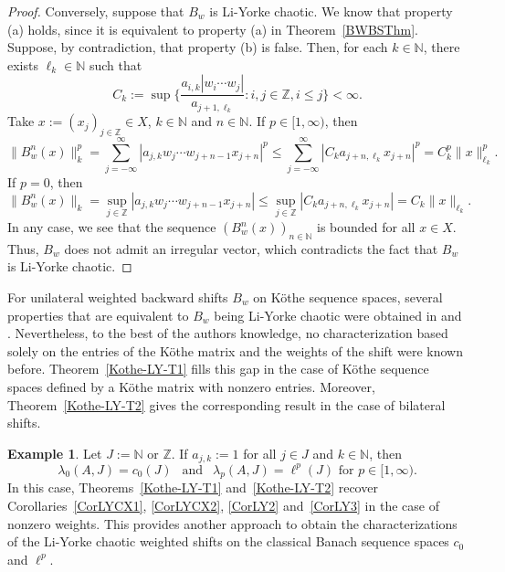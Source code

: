 \documentclass[12pt]{amsart}
\theoremstyle{theorem}
\theoremstyle{definition}
\newtheorem{example}[theorem]{Example}
\theoremstyle{remark} \theoremstyle{question} \theoremstyle{example}
\newcommand{\N}{\mathbb{N}}
\newcommand{\Z}{\mathbb{Z}}
\begin{document}
\begin{proof}
Conversely, suppose that $B_w$ is Li-Yorke chaotic.
We know that property (a) holds, since it is equivalent to property (a) in Theorem~\ref{BWBSThm}.
Suppose, by contradiction, that property (b) is false.
Then, for each $k \in \N$, there exists $\ell_k \in \N$ such that
\[
C_k\!:= \sup\Big\{\frac{a_{i,k} |w_i \cdots w_j|}{a_{j+1,\ell_k}} : i,j \in \Z, i \leq j\Big\} < \infty.
\]
Take $x\!:= (x_j)_{j \in \Z} \in X$, $k \in \N$ and $n \in \N$. If $p \in [1,\infty)$, then
\[
\|B_w^n(x)\|_k^p = \sum_{j=-\infty}^\infty |a_{j,k} w_j \cdots w_{j+n-1} x_{j+n}|^p
  \leq \sum_{j=-\infty}^\infty |C_k a_{j+n,\ell_k} x_{j+n}|^p = C_k^p \|x\|_{\ell_k}^p.
\]
If $p = 0$, then
\[
\|B_w^n(x)\|_k = \sup_{j \in \Z} |a_{j,k} w_j \cdots w_{j+n-1} x_{j+n}|
  \leq \sup_{j \in \Z} |C_k a_{j+n,\ell_k} x_{j+n}| = C_k \|x\|_{\ell_k}.
\]
In any case, we see that the sequence $(B_w^n(x))_{n \in \N}$ is bounded for all $x \in X$.
Thus, $B_w$ does not admit an irregular vector, which contradicts the fact that $B_w$ is Li-Yorke chaotic.
\end{proof}

For unilateral weighted backward shifts $B_w$ on K\"othe sequence spaces, 
several properties that are equivalent to $B_w$ being Li-Yorke chaotic were obtained in
\cite[Theorem~1]{XWuPZhu13} and \cite[Theorem~3.3]{WuCheZhu14}.
Nevertheless, to the best of the authors knowledge, no characterization based solely on the entries of the K\"othe matrix
and the weights of the shift were known before.
Theorem~\ref{Kothe-LY-T1} fills this gap in the case of K\"othe sequence spaces defined by a K\"othe matrix with nonzero entries.
Moreover, Theorem~\ref{Kothe-LY-T2} gives the corresponding result in the case of bilateral shifts.

\begin{example}
Let $J\!:= \N$ or $\Z$. If $a_{j,k}\!:= 1$ for all $j \in J$ and $k \in \N$, then
\[
\lambda_0(A,J) = c_0(J) \ \ \text{ and } \ \ \lambda_p(A,J) = \ell^p(J) \text{ for } p \in [1,\infty).
\]
In this case, Theorems~\ref{Kothe-LY-T1} and~\ref{Kothe-LY-T2} recover 
Corollaries~\ref{CorLYCX1}, \ref{CorLYCX2}, \ref{CorLY2} and~\ref{CorLY3}
in the case of nonzero weights.
This provides another approach to obtain the characterizations of the Li-Yorke chaotic weighted shifts
on the classical Banach sequence spaces $c_0$ and $\ell^p$.
\end{example}
\end{document}
